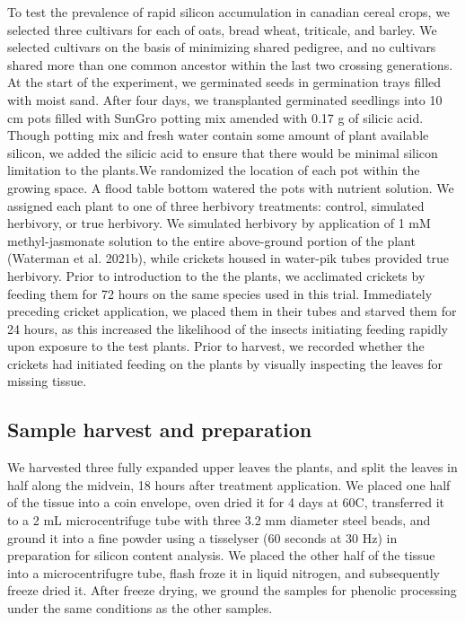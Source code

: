 \documentclass[12pt, letterpaper, ]{report}
\begin{document}
To test the prevalence of rapid silicon accumulation in canadian cereal crops, we selected three cultivars for each of oats, bread wheat, triticale, and barley. We selected cultivars on the basis of minimizing shared pedigree, and no cultivars shared more than one common ancestor within the last two crossing generations. At the start of the experiment, we germinated seeds in germination trays filled with moist sand. After four days, we transplanted germinated seedlings into 10 cm pots filled with SunGro potting mix amended with 0.17 g of silicic acid. Though potting mix and fresh water contain some amount of plant available silicon, we added the silicic acid to ensure that there would be minimal silicon limitation to the plants.We randomized the location of each pot within the growing space. A flood table bottom watered the pots with nutrient solution. We assigned each plant to one of three herbivory treatments: control, simulated herbivory, or true herbivory. We simulated herbivory by application of 1 mM methyl-jasmonate solution to the entire above-ground portion of the plant (Waterman et al. 2021b), while crickets housed in water-pik tubes provided true herbivory. Prior to introduction to the the plants, we acclimated crickets by feeding them for 72 hours on the same species used in this trial. Immediately preceding cricket application, we placed them in their tubes and starved them for 24 hours, as this increased the likelihood of the insects initiating feeding rapidly upon exposure to the test plants. Prior to harvest, we recorded whether the crickets had initiated feeding on the plants by visually inspecting the leaves for missing tissue. 

\subsection{Sample harvest and preparation}

We harvested three fully expanded upper leaves the plants, and split the leaves in half along the midvein, 18 hours after treatment application. We placed one half of the tissue into a coin envelope, oven dried it for 4 days at 60\degree C, transferred it to a 2 mL microcentrifuge tube with three 3.2 mm diameter steel beads, and ground it into a fine powder using a tisselyser (60 seconds at 30 Hz) in preparation for silicon content analysis. We placed the other half of the tissue into a microcentrifugre tube, flash froze it in liquid nitrogen, and subsequently freeze dried it. After freeze drying, we ground the samples for phenolic processing under the same conditions as the other samples.
\end{document}
